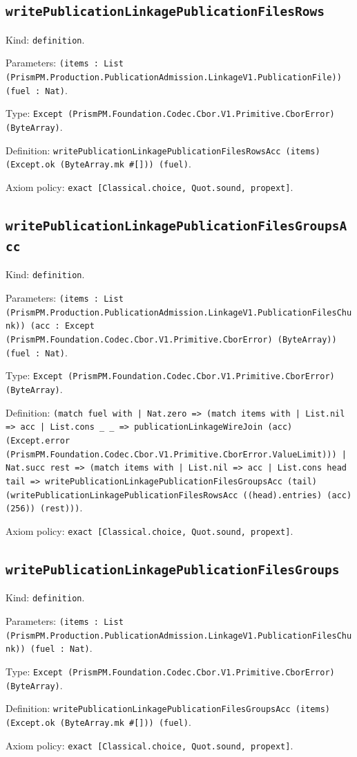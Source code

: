 \documentclass[11pt]{article}
\begin{document}
\subsection*{\texttt{writePublicationLinkagePublicationFilesRows}}
\noindent Kind: \texttt{definition}.\par
\noindent Parameters: \texttt{(items : List (PrismPM.Production.PublicationAdmission.LinkageV1.PublicationFile)) (fuel : Nat)}.\par
\noindent Type: \texttt{Except (PrismPM.Foundation.Codec.Cbor.V1.Primitive.CborError) (ByteArray)}.\par
\noindent Definition: \texttt{writePublicationLinkagePublicationFilesRowsAcc (items) (Except.ok (ByteArray.mk \#[])) (fuel)}.\par
\noindent Axiom policy: \texttt{exact [Classical.choice, Quot.sound, propext]}.\par
\subsection*{\texttt{writePublicationLinkagePublicationFilesGroupsAcc}}
\noindent Kind: \texttt{definition}.\par
\noindent Parameters: \texttt{(items : List (PrismPM.Production.PublicationAdmission.LinkageV1.PublicationFilesChunk)) (acc : Except (PrismPM.Foundation.Codec.Cbor.V1.Primitive.CborError) (ByteArray)) (fuel : Nat)}.\par
\noindent Type: \texttt{Except (PrismPM.Foundation.Codec.Cbor.V1.Primitive.CborError) (ByteArray)}.\par
\noindent Definition: \texttt{(match fuel with | Nat.zero => (match items with | List.nil => acc | List.cons \_ \_ => publicationLinkageWireJoin (acc) (Except.error (PrismPM.Foundation.Codec.Cbor.V1.Primitive.CborError.ValueLimit))) | Nat.succ rest => (match items with | List.nil => acc | List.cons head tail => writePublicationLinkagePublicationFilesGroupsAcc (tail) (writePublicationLinkagePublicationFilesRowsAcc ((head).entries) (acc) (256)) (rest)))}.\par
\noindent Axiom policy: \texttt{exact [Classical.choice, Quot.sound, propext]}.\par
\subsection*{\texttt{writePublicationLinkagePublicationFilesGroups}}
\noindent Kind: \texttt{definition}.\par
\noindent Parameters: \texttt{(items : List (PrismPM.Production.PublicationAdmission.LinkageV1.PublicationFilesChunk)) (fuel : Nat)}.\par
\noindent Type: \texttt{Except (PrismPM.Foundation.Codec.Cbor.V1.Primitive.CborError) (ByteArray)}.\par
\noindent Definition: \texttt{writePublicationLinkagePublicationFilesGroupsAcc (items) (Except.ok (ByteArray.mk \#[])) (fuel)}.\par
\noindent Axiom policy: \texttt{exact [Classical.choice, Quot.sound, propext]}.\par
\end{document}
